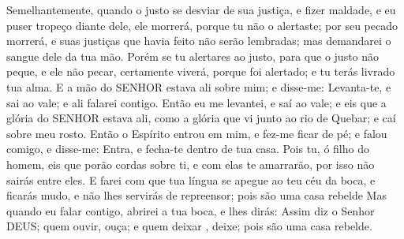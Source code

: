 {  Semelhantemente, quando o justo se desviar de sua justiça, e fizer maldade, e eu puser
{} tropeço diante dele, ele morrerá, porque tu não o alertaste; por seu pecado morrerá, e suas justiças que havia feito não serão lembradas; mas demandarei o sangue dele da tua mão.
  Porém se tu alertares ao justo, para que o justo não peque, e ele não pecar, certamente viverá, porque foi alertado; e tu terás livrado tua alma.
  E a mão do SENHOR estava ali sobre mim; e disse-me: Levanta-te, e sai ao vale; e ali falarei contigo.
  Então eu me levantei, e saí ao vale; e eis que a glória do SENHOR estava ali, como a glória que vi junto ao rio de Quebar; e caí sobre meu rosto.
  Então o Espírito entrou em mim, e fez-me ficar de pé; e falou comigo, e disse-me: Entra, e fecha-te dentro de tua casa.
  Pois tu, ó filho do homem, eis que porão cordas sobre ti, e com elas te amarrarão, por isso não sairás entre eles.
  E farei com que tua língua se apegue ao teu céu da boca, e ficarás mudo, e não lhes servirás de repreensor; pois são uma casa rebelde
  Mas quando eu falar contigo, abrirei a tua boca, e lhes dirás: Assim diz o Senhor DEUS; quem ouvir, ouça; e quem deixar
{}, deixe; pois são uma casa rebelde.
\par }

